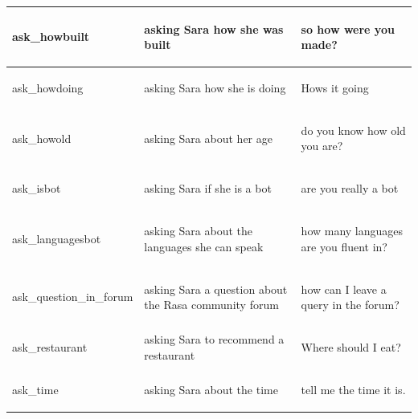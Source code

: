 \documentclass[bsc,frontabs,singlespacing,parskip,deptreport]{infthesis}
\begin{document}
{\begin{center}
\begin{longtable}{p{}|p{}|p{}}
    \hline
    \begin{spverbatim}ask_howbuilt\end{spverbatim} & asking Sara how she was built & \begin{spverbatim}so how were you made?\end{spverbatim} \\
    \hline
    \begin{spverbatim}ask_howdoing\end{spverbatim} & asking Sara how she is doing & \begin{spverbatim}Hows it going\end{spverbatim} \\
    \hline
    \begin{spverbatim}ask_howold\end{spverbatim} & asking Sara about her age & \begin{spverbatim}do you know how old you are?\end{spverbatim} \\
    \hline
    \begin{spverbatim}ask_isbot\end{spverbatim} & asking Sara if she is a bot & \begin{spverbatim}are you really a bot\end{spverbatim} \\
    \hline
    \begin{spverbatim}ask_languagesbot\end{spverbatim} & asking Sara about the languages she can speak & \begin{spverbatim}how many languages are you fluent in?\end{spverbatim} \\
    \hline
    \begin{spverbatim}ask_question_in_forum\end{spverbatim} & asking Sara a question about the Rasa community forum & \begin{spverbatim}how can I leave a query in the forum?\end{spverbatim} \\
    \hline
    \begin{spverbatim}ask_restaurant\end{spverbatim} & asking Sara to recommend a restaurant & \begin{spverbatim}Where should I eat?\end{spverbatim} \\
    \hline
    \begin{spverbatim}ask_time\end{spverbatim} & asking Sara about the time & \begin{spverbatim}tell me the time it is.\end{spverbatim} \\

\end{longtable}
\end{center}}
\end{document}
